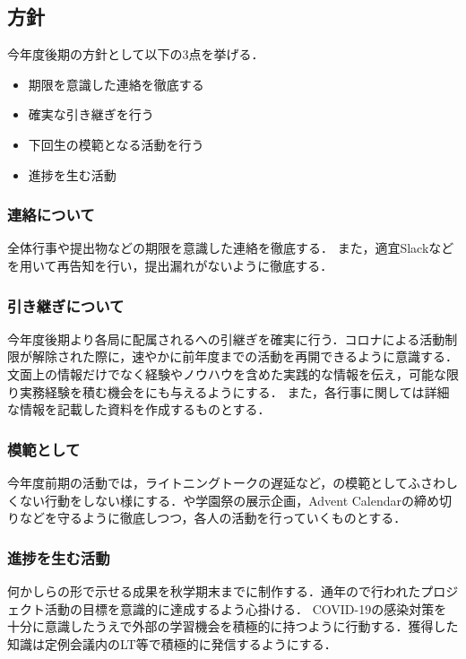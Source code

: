 \subsection*{\newGradeIfKouki{}\secondGrade{}方針}


今年度後期の\secondGrade{}方針として以下の3点を挙げる．

\begin{itemize}
    \item 期限を意識した連絡を徹底する
    \item 確実な引き継ぎを行う
    \item 下回生の模範となる活動を行う
    \item 進捗を生む活動
\end{itemize}

\subsubsection*{連絡について}
全体行事や提出物などの期限を意識した連絡を徹底する．
また，適宜Slackなどを用いて再告知を行い，提出漏れがないように徹底する．

\subsubsection*{引き継ぎについて}
今年度後期より各局に配属される\firstGrade{}への引継ぎを確実に行う．コロナによる活動制限が解除された際に，速やかに前年度までの活動を再開できるように意識する．
文面上の情報だけでなく経験やノウハウを含めた実践的な情報を伝え，可能な限り実務経験を積む機会を\firstGrade{}にも与えるようにする．
また，各行事に関しては詳細な情報を記載した資料を作成するものとする．

\subsubsection*{模範として}
今年度前期の活動では，ライトニングトークの遅延など，\firstGrade{}の模範としてふさわしくない行動をしない様にする．や学園祭の展示企画，Advent Calendarの締め切りなどを守るように徹底しつつ，各人の活動を行っていくものとする．

\subsubsection*{進捗を生む活動}
何かしらの形で示せる成果を秋学期末までに制作する．通年ので行われたプロジェクト活動の目標を意識的に達成するよう心掛ける．
COVID-19の感染対策を十分に意識したうえで外部の学習機会を積極的に持つように行動する．獲得した知識は定例会議内のLT等で積極的に発信するようにする．

